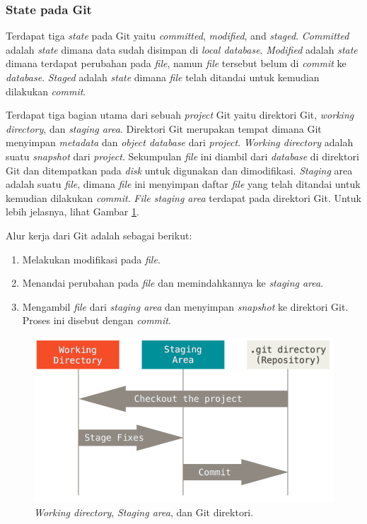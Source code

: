 \subsubsection{State pada Git}
Terdapat tiga \textit{state} pada Git yaitu \textit{committed}, \textit{modified}, and \textit{staged}. \textit{Committed} adalah \textit{state} dimana data sudah disimpan di \textit{local database}. \textit{Modified} adalah \textit{state} dimana terdapat perubahan pada \textit{file}, namun \textit{file} tersebut belum di \textit{commit} ke \textit{database}. \textit{Staged} adalah \textit{state} dimana \textit{file} telah ditandai untuk kemudian dilakukan \textit{commit}.

Terdapat tiga bagian utama dari sebuah \textit{project} Git yaitu direktori Git, \textit{working directory}, dan \textit{staging area}. Direktori Git merupakan tempat dimana Git menyimpan \textit{metadata} dan \textit{object database} dari \textit{project}. \textit{Working directory} adalah suatu \textit{snapshot} dari \textit{project}. Sekumpulan \textit{file} ini diambil dari \textit{database} di direktori Git dan ditempatkan pada \textit{disk} untuk digunakan dan dimodifikasi. \textit{Staging} area adalah suatu \textit{file}, dimana \textit{file} ini menyimpan daftar \textit{file} yang telah ditandai untuk kemudian dilakukan \textit{commit}. \textit{File staging area} terdapat pada direktori Git. Untuk lebih jelasnya, lihat Gambar \ref{fig:git_state}.

Alur kerja dari Git adalah sebagai berikut:
\begin{enumerate}
\item Melakukan modifikasi pada \textit{file}.
\item Menandai perubahan pada \textit{file} dan memindahkannya ke \textit{staging area}.
\item Mengambil \textit{file} dari \textit{staging area} dan menyimpan \textit{snapshot} ke direktori Git. Proses ini disebut dengan \textit{commit}.
\end{enumerate}  

\begin{figure}[H]
	\centering
		\includegraphics[scale=0.5]{Gambar/git_state.png}
	\caption{ \textit{Working directory}, \textit{Staging area}, dan Git direktori\cite{chacon2014pro}.}
	\label{fig:git_state}
\end{figure}

